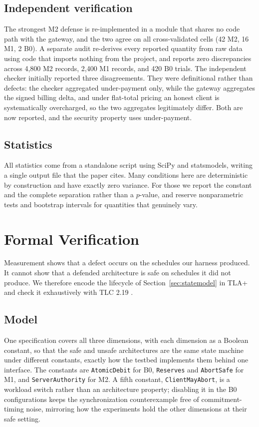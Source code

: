 \documentclass[preprint,3p,authoryear,12pt]{elsarticle}
\begin{document}
\subsection{Independent verification}
The strongest M2 defense is re-implemented in a module that shares no code path with the
gateway, and the two agree on all cross-validated cells (42 M2, 16 M1, 2 B0). A separate
audit re-derives every reported quantity from raw data using code that imports nothing
from the project, and reports zero discrepancies across 4{,}800 M2 records, 2{,}400 M1
records, and 420 B0 trials. The independent checker initially reported three
disagreements. They were definitional rather than defects: the checker aggregated
under-payment only, while the gateway aggregates the signed billing delta, and under
flat-total pricing an honest client is systematically overcharged, so the two aggregates
legitimately differ. Both are now reported, and the security property uses under-payment.

\subsection{Statistics}
All statistics come from a standalone script using SciPy and statsmodels, writing a
single output file that the paper cites. Many conditions here are deterministic by
construction and have exactly zero variance. For those we report the constant and the
complete separation rather than a $p$-value, and reserve nonparametric tests and
bootstrap intervals for quantities that genuinely vary.

\section{Formal Verification}
\label{sec:formal}
Measurement shows that a defect occurs on the schedules our harness produced. It cannot
show that a defended architecture is safe on schedules it did not produce. We therefore
encode the lifecycle of Section~\ref{sec:statemodel} in TLA+ \citep{tla} and check it
exhaustively with TLC 2.19 \citep{tlc}.

\subsection{Model}
One specification covers all three dimensions, with each dimension as a Boolean constant,
so that the safe and unsafe architectures are the same state machine under different
constants, exactly how the testbed implements them behind one interface. The constants
are \texttt{AtomicDebit} for B0, \texttt{Reserves} and \texttt{AbortSafe} for M1, and
\texttt{ServerAuthority} for M2. A fifth constant, \texttt{ClientMayAbort}, is a workload
switch rather than an architecture property; disabling it in the B0 configurations keeps
the synchronization counterexample free of commitment-timing noise, mirroring how the
experiments hold the other dimensions at their safe setting.
\end{document}
